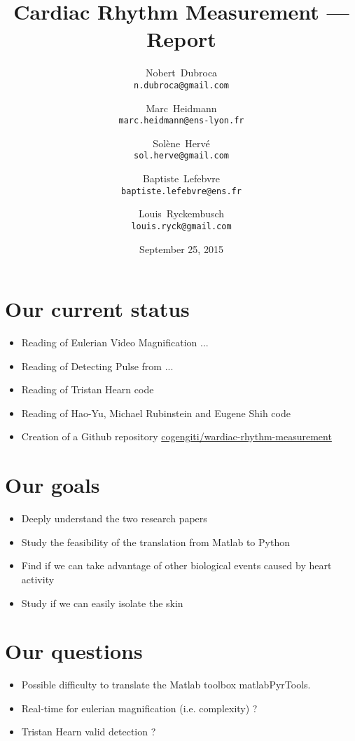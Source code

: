 \documentclass[a4paper]{article}
\title{Cardiac Rhythm Measurement --- Report}
\author{Nobert~Dubroca \\ \small{\texttt{n.dubroca@gmail.com}}
  \and Marc~Heidmann \\ \small{\texttt{marc.heidmann@ens-lyon.fr}}
  \and Sol\`{e}ne~Herv\'{e} \\ \small{\texttt{sol.herve@gmail.com}}
  \and Baptiste~Lefebvre \\ \small{\texttt{baptiste.lefebvre@ens.fr}}
  \and Louis~Ryckembusch \\ \small{\texttt{louis.ryck@gmail.com}}}
\date{September 25, 2015}
\begin{document}
\maketitle


\section{Our current status}

\begin{itemize}
\item Reading of Eulerian Video Magnification ... \cite{wu2012eulerian}
\item Reading of Detecting Pulse from ... \cite{balakrishnan2013detecting}
\item Reading of Tristan Hearn code
\item Reading of Hao-Yu, Michael Rubinstein and Eugene Shih code
\item Creation of a Github repository \href{https://github.com/cogengiti/cardiac-rhythm-measurement}{cogengiti/wardiac-rhythm-measurement}
\end{itemize}


\section{Our goals}

\begin{itemize}
\item Deeply understand the two research papers
\item Study the feasibility of the translation from Matlab to Python
\item Find if we can take advantage of other biological events caused by heart activity
\item Study if we can easily isolate the skin
\end{itemize}


\section{Our questions}

\begin{itemize}
\item Possible difficulty to translate the Matlab toolbox matlabPyrTools.
\item Real-time for eulerian magnification (i.e. complexity) ?
\item Tristan Hearn valid detection ?
\end{itemize}




\end{document}
